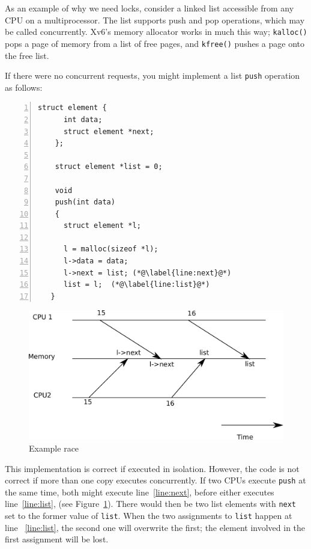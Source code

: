 As an example of why we need locks,
consider a linked list accessible from any
CPU on a multiprocessor.
The list supports push and pop operations, which
may be called concurrently.
Xv6's memory allocator works in much this way;
\lstinline{kalloc()}
pops a page of memory from a list of free pages,
and
\lstinline{kfree()}
pushes a page onto the free list.

If there were no
concurrent requests, you might implement a list
\lstinline{push}
operation as follows:
\begin{lstlisting}[numbers=left,firstnumber=1]
    struct element {
      int data;
      struct element *next;
    };
    
    struct element *list = 0;
    
    void
    push(int data)
    {
      struct element *l;
   
      l = malloc(sizeof *l);
      l->data = data;
      l->next = list; (*@\label{line:next}@*)
      list = l;  (*@\label{line:list}@*)
   }
\end{lstlisting}

\begin{figure}[t]
\center
\includegraphics[scale=0.5]{fig/race.pdf}
\caption{Example race}
\label{fig:race}
\end{figure}
This implementation is correct if executed in isolation.
However, the code is not correct if more than one
copy executes concurrently.
If two CPUs execute
\lstinline{push}
at the same time,
both might execute line~\ref{line:next},
before either executes line~\ref{line:list},  (see 
Figure~\ref{fig:race}).
There would then be two
list elements with
\lstinline{next}
set to the former value of
\lstinline{list}.
When the two assignments to
\lstinline{list}
happen at line ~\ref{line:list},
the second one will overwrite the first;
the element involved in the first assignment
will be lost.

